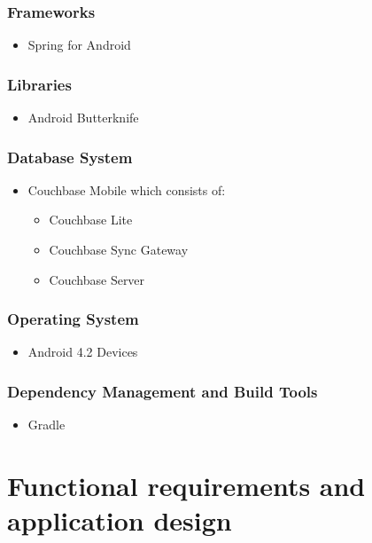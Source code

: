 \documentclass[a4paper,10pt]{article}
\begin{document}
\subsubsection{Frameworks}
	\begin{itemize}
		\item Spring for Android
	\end{itemize}

\subsubsection{Libraries}
	\begin{itemize}
		\item Android Butterknife
	\end{itemize}

\subsubsection{Database System}
	\begin{itemize}
		\item Couchbase Mobile which consists of:
		\begin{itemize}
			\item Couchbase Lite
			\item Couchbase Sync Gateway
			\item Couchbase Server
		\end{itemize}
	\end{itemize}

\subsubsection{Operating System}
	\begin{itemize}
		\item Android 4.2 Devices
	\end{itemize}

\subsubsection{Dependency Management and Build Tools}
	\begin{itemize}
		\item Gradle
	\end{itemize}

\clearpage
\section{Functional requirements and application design}
\end{document}
